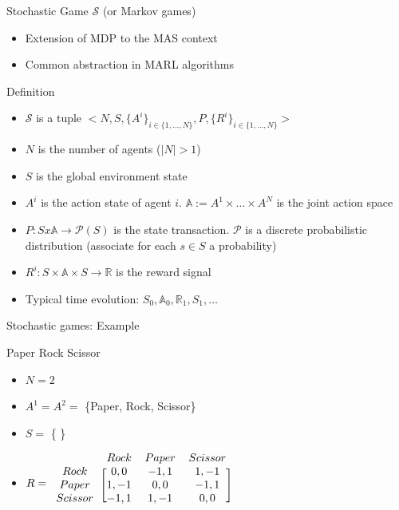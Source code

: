 \documentclass[presentation]{beamer}\mode<presentation>{\usetheme{AMSBolognaFC}}
\begin{document}
\begin{frame}[c]{Stochastic Game $\mathcal{S}$ (or Markov games)}
	\begin{alertblock}{}
		\begin{itemize}
			\item Extension of MDP to the MAS context
			\item Common abstraction in MARL algorithms
		\end{itemize}
	\end{alertblock}
	\begin{alertblock}{Definition}
		\begin{itemize}
			\item $\mathcal{S}$ is a tuple $<N, S, \{A^i\}_{i \in \{ 1, \dots, N\}}, P, \{R^i\}_{i \in \{ 1, \dots, N\}}>$
			\item $N$ is the number of agents ($|N| > 1 $)
			\item $S$ is the global environment state
			\item $A^i$ is the action state of agent $i$. $\mathbb{A} := A^1 \times \dots\times A^N$ is the joint action space
			\item $P: S x \mathbb{A} \rightarrow \mathcal{P}(S)$ is the state transaction. $\mathcal{P}$ is a discrete probabilistic distribution (associate for each $s \in S$ a probability)
			\item $R^i: S \times \mathbb{A} \times S \rightarrow \mathbb{R}$ is the reward signal
			\item Typical time evolution: $ S_0, \mathbb{A}_0, \mathbb{R}_1, S_1, \dots  $
		\end{itemize}
	\end{alertblock}
\end{frame}
\begin{frame}[fragile]{Stochastic games: Example}
	\begin{exampleblock}{Paper Rock Scissor}
		\begin{itemize}
			\item $N = 2$
			\item $A^1 = A^2 = $ \{Paper, Rock, Scissor\}
			\item $S = $ \{ \}
			\item $R = \begin{blockarray}{cccc}
        & Rock & Paper & Scissor \\
      \begin{block}{c[ccc]}
        Rock    & 0, 0  & -1, 1 & 1, -1 \\
        Paper   & 1, -1 & 0, 0  & -1, 1 \\
        Scissor & -1, 1 & 1, -1 & 0, 0 \\
      \end{block}
    \end{blockarray}$
		\end{itemize}
	\end{exampleblock}
\end{frame}
\end{document}
